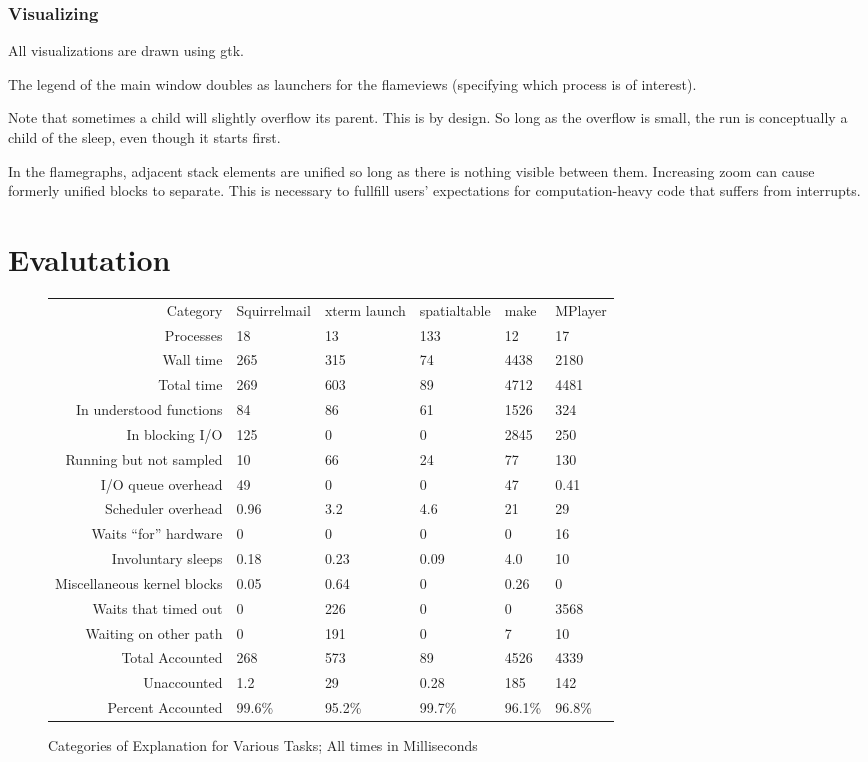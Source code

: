 \documentclass[10pt]{article}
\begin{document}
\subsubsection{Visualizing}

All visualizations are drawn using gtk.

The legend of the main window doubles as launchers for the flameviews (specifying which process is of interest).

Note that sometimes a child will slightly overflow its parent.  This is by design.  So long as the overflow is small, the run is conceptually a child of the sleep, even though it starts first.

In the flamegraphs, adjacent stack elements are unified so long as there is nothing visible between them.  Increasing zoom can cause formerly unified blocks to separate.  This is necessary to fullfill users' expectations for computation-heavy code that suffers from interrupts.

\section{Evalutation}

\begin{figure}[t]
\begin{tabular}{r|C{.77in}C{.8in}C{.77in}C{.77in}C{.77in}}
Category & Squirrelmail & xterm launch & spatialtable & make & MPlayer\\
Processes & 18 & 13 & 133 & 12 & 17\\
\hline
Wall time & 265 & 315 & 74 & 4438 & 2180\\
Total time & 269 & 603 & 89 & 4712 & 4481\\
\hline
In understood functions & 84 & 86 & 61 & 1526 & 324\\
In blocking I/O & 125 & 0 & 0 & 2845 & 250\\
Running but not sampled & 10 & 66 & 24 & 77 & 130\\
I/O queue overhead & 49 & 0 & 0 & 47 & 0.41\\
Scheduler overhead & 0.96 & 3.2 & 4.6 & 21 & 29\\
Waits ``for'' hardware & 0 & 0 & 0 & 0 & 16\\
Involuntary sleeps & 0.18 & 0.23 & 0.09 & 4.0 & 10\\
Miscellaneous kernel blocks & 0.05 & 0.64 & 0 & 0.26 & 0\\
Waits that timed out & 0 & 226 & 0 & 0 & 3568\\
Waiting on other path & 0 & 191 & 0 & 7 & 10\\
\hline
Total Accounted & 268 & 573 & 89 & 4526 & 4339\\
Unaccounted & 1.2 & 29 & 0.28 & 185 & 142\\
Percent Accounted & 99.6\% & 95.2\% & 99.7\% & 96.1\% & 96.8\%\\
\end{tabular}
\caption{Categories of Explanation for Various Tasks; All times in Milliseconds}
\label{fig:restab}
\end{figure}
\end{document}
